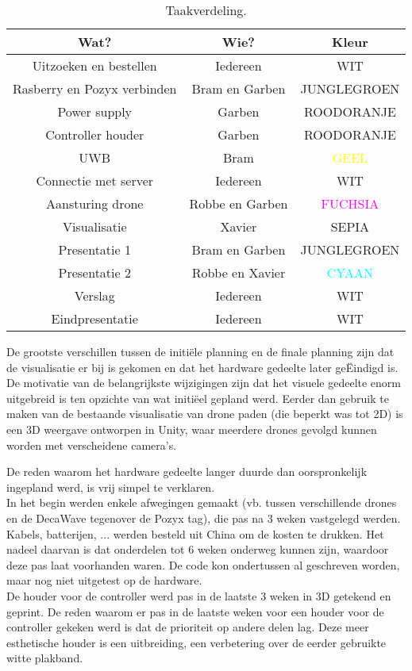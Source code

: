 \begin{table}[p]
	\centering
	\begin{tabular}{ |c|c|c| } \hline
		Wat? & Wie? & Kleur \\ [.5ex] \hline\hline
		Uitzoeken en bestellen & Iedereen & WIT \\ \hline
		Rasberry en Pozyx verbinden & Bram en Garben & \textcolor{JungleGreen}{JUNGLEGROEN} \\ \hline
		Power supply & Garben & \textcolor{RedOrange}{ROODORANJE} \\ \hline
		Controller houder & Garben & \textcolor{RedOrange}{ROODORANJE} \\ \hline
		UWB & Bram & \textcolor{Yellow}{GEEL} \\ \hline
		Connectie met server & Iedereen & WIT \\ \hline
		Aansturing drone & Robbe en Garben & \textcolor{Fuchsia}{FUCHSIA} \\ \hline
		Visualisatie & Xavier & \textcolor{Sepia}{SEPIA} \\ \hline
		Presentatie 1 & Bram en Garben & \textcolor{JungleGreen}{JUNGLEGROEN} \\ \hline
		Presentatie 2 & Robbe en Xavier & \textcolor{Cyan}{CYAAN} \\ \hline
		Verslag & Iedereen & WIT \\ \hline
		Eindpresentatie & Iedereen & WIT \\ \hline
	\end{tabular}
	\caption[Taakverdeling]{Taakverdeling.}
	\label{tab:taakverdeling}
\end{table}

De grootste verschillen tussen de initiële planning en de finale planning zijn dat de visualisatie er bij is gekomen en dat het hardware gedeelte later geËindigd is.\\

De motivatie van de belangrijkste wijzigingen zijn dat het visuele gedeelte enorm uitgebreid is ten opzichte van wat initiëel gepland werd.
Eerder dan gebruik te maken van de bestaande visualisatie van drone paden (die beperkt was tot 2D) is een 3D weergave ontworpen in Unity, waar meerdere drones gevolgd kunnen worden met verscheidene camera's.

De reden waarom het hardware gedeelte langer duurde dan oorspronkelijk ingepland werd, is vrij simpel te verklaren.\\
In het begin werden enkele afwegingen gemaakt (vb. tussen verschillende drones en de DecaWave tegenover de Pozyx tag), die pas na 3 weken vastgelegd werden.\\
Kabels, batterijen, ... werden besteld uit China om de kosten te drukken.
Het nadeel daarvan is dat onderdelen tot 6 weken onderweg kunnen zijn, waardoor deze pas laat voorhanden waren.
De code kon ondertussen al geschreven worden, maar nog niet uitgetest op de hardware.\\
De houder voor de controller werd pas in de laatste 3 weken in 3D getekend en geprint.
De reden waarom er pas in de laatste weken voor een houder voor de controller gekeken werd is dat de prioriteit op andere delen lag.
Deze meer esthetische houder is een uitbreiding, een verbetering over de eerder gebruikte witte plakband.